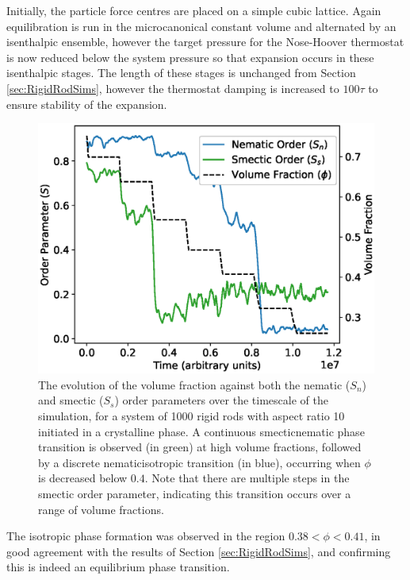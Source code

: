 \documentclass[11pt, a4paper]{article} %
\begin{document}
Initially, the particle force centres are placed on a simple cubic lattice. Again equilibration is run in the microcanonical constant volume and alternated by an isenthalpic ensemble, however the target pressure for the Nose-Hoover thermostat is now reduced below the system pressure so that expansion occurs in these isenthalpic stages. The length of these stages is unchanged from Section \ref{sec:RigidRodSims}, however the thermostat damping is increased to $100\tau$ to ensure stability of the expansion.

\begin{figure} [h!]
	\centering
	\includegraphics[width=0.7\linewidth]{Figures/rigidrod_cryorderparam}
	\caption{The evolution of the volume fraction against both the nematic ($S_{n}$) and smectic ($S_{s}$) order parameters over the timescale of the simulation, for a system of 1000 rigid rods with aspect ratio 10 initiated in a crystalline phase. A continuous smectic\textendash nematic phase transition is observed (in green) at high volume fractions, followed by a discrete nematic\textendash isotropic transition (in blue), occurring when $\phi$ is decreased below $0.4$. Note that there are multiple steps in the smectic order parameter, indicating this transition occurs over a range of volume fractions.}
	\label{fig:rr_crystalorder}
\end{figure} %


The isotropic phase formation was observed in the region $0.38 < \phi< 0.41$, in good agreement with the results of Section \ref{sec:RigidRodSims}, and confirming this is indeed an equilibrium phase transition. 
\end{document}
